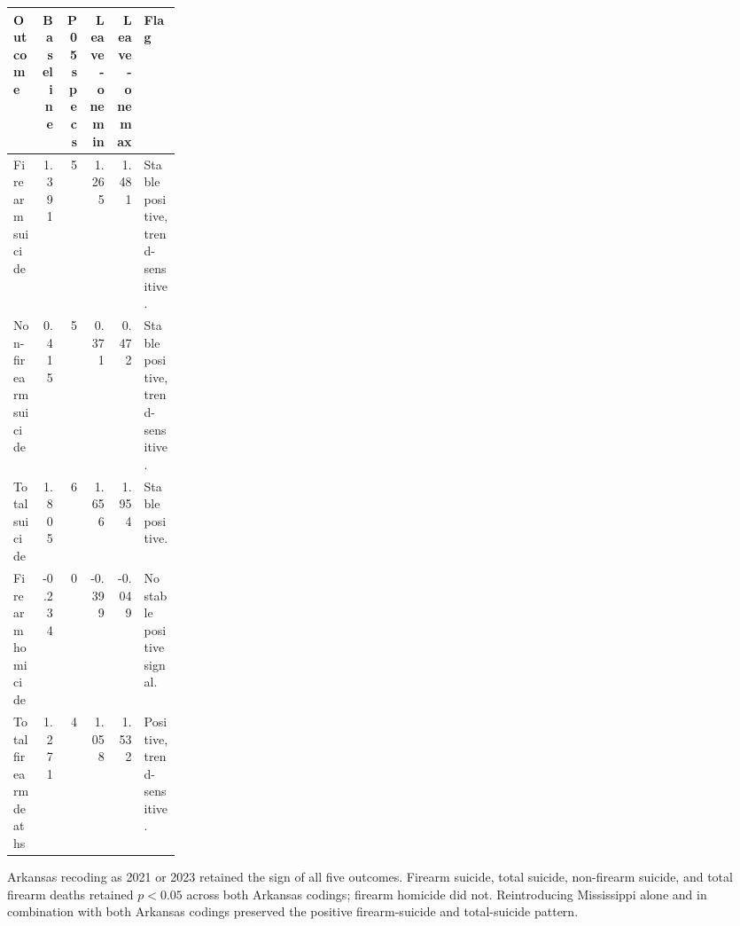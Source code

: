 \documentclass[10pt]{article}
\begin{document}
\begin{center}
\begin{tabular}{lrrrrp{0.22\linewidth}}
\toprule
Outcome & Baseline & P05 specs & Leave-one min & Leave-one max & Flag \\
\midrule
Firearm suicide & 1.391 & 5 & 1.265 & 1.481 & Stable positive, trend-sensitive. \\
Non-firearm suicide & 0.415 & 5 & 0.371 & 0.472 & Stable positive, trend-sensitive. \\
Total suicide & 1.805 & 6 & 1.656 & 1.954 & Stable positive. \\
Firearm homicide & -0.234 & 0 & -0.399 & -0.049 & No stable positive signal. \\
Total firearm deaths & 1.271 & 4 & 1.058 & 1.532 & Positive, trend-sensitive. \\
\bottomrule
\end{tabular}
\end{center}

Arkansas recoding as 2021 or 2023 retained the sign of all five outcomes. Firearm suicide, total suicide, non-firearm suicide, and total firearm deaths retained $p<0.05$ across both Arkansas codings; firearm homicide did not. Reintroducing Mississippi alone and in combination with both Arkansas codings preserved the positive firearm-suicide and total-suicide pattern.
\end{document}
